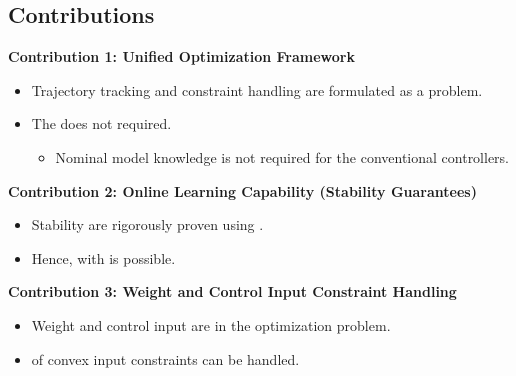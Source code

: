 \documentclass[8pt, aspectratio=169, handout]{beamer}
\newcommand{\ctxt}[2]{\color{#1}{#2}\color{black}}
\begin{document}

\subsection{Contributions}

\begin{frame}{\insertsubsectionhead}

  \textbf{Contribution 1: Unified Optimization Framework} 
  {
    \begin{itemize}
      \item Trajectory tracking and constraint handling are formulated as a \ctxt{airforceblue}{unified constrained optimization } problem.
      \item The \ctxt{awesome}{conventional controllers } does not required.
      \begin{itemize}
        \item Nominal model knowledge is not required for the conventional controllers.
      \end{itemize}
    \end{itemize}
  }

  \textbf{Contribution 2: Online Learning Capability (Stability Guarantees)}
  {
    \begin{itemize}
      \item Stability are rigorously proven using \ctxt{airforceblue}{Lyapunov stability theory}.
      \item Hence, \ctxt{airforceblue}{online learning} with \ctxt{awesome}{no prior system knowledge } is possible.
    \end{itemize}
  }

  \textbf{Contribution 3: Weight and Control Input Constraint Handling}
  {
    \begin{itemize}
      \item Weight and control input \ctxt{awesome}{constraints } are \ctxt{airforceblue}{explicitly considered } in the optimization problem.
      \item \ctxt{airforceblue}{Any combination } of convex input constraints can be handled.
    \end{itemize}
  }

\end{frame}
\end{document}
